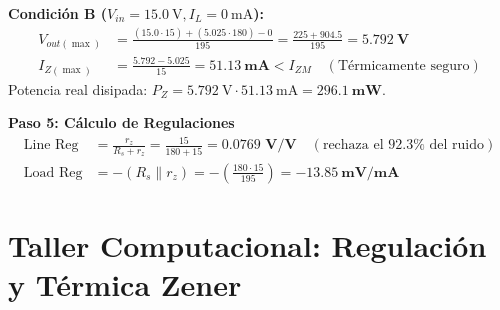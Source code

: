 \documentclass[11pt, a4paper]{article}
\begin{document}
\textbf{Condición B ($V_{in} = \qty{15.0}{\volt}, I_L = \qty{0}{\milli\ampere}$):}
\begin{align}
    V_{out(\max)} &= \frac{(15.0 \cdot 15) + (5.025 \cdot 180) - 0}{195} = \frac{225 + 904.5}{195} = \mathbf{\qty{5.792}{\volt}} \\
    I_{Z(\max)} &= \frac{5.792 - 5.025}{15} = \mathbf{\qty{51.13}{\milli\ampere}} < I_{ZM} \quad (\text{Térmicamente seguro})
\end{align}
Potencia real disipada: $P_Z = \qty{5.792}{\volt} \cdot \qty{51.13}{\milli\ampere} = \mathbf{\qty{296.1}{\milli\watt}}$.

\noindent\textbf{Paso 5: Cálculo de Regulaciones}\\
\begin{align}
    \text{Line Reg} &= \frac{r_z}{R_s + r_z} = \frac{15}{180 + 15} = \mathbf{0.0769\text{ V/V}} \quad (\text{rechaza el } 92.3\% \text{ del ruido}) \\
    \text{Load Reg} &= -(R_s \parallel r_z) = -\left(\frac{180 \cdot 15}{195}\right) = \mathbf{\qty{-13.85}{\milli\volt\per\milli\ampere}}
\end{align}

\newpage
\section{Taller Computacional: Regulación y Térmica Zener}
\end{document}
